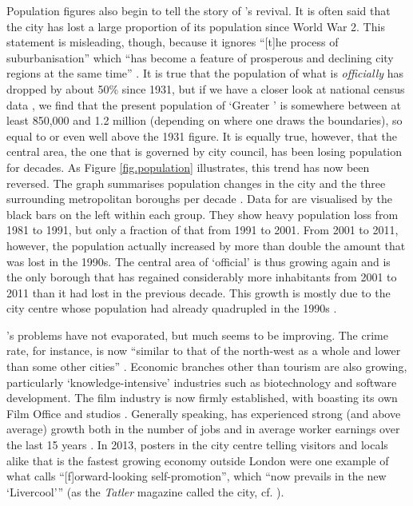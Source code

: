 Population figures also begin to tell the story of 's revival.
It is often said that the city has lost a large proportion of its population since World War 2.
This statement is misleading, though, because it ignores ``[t]he process of suburbanisation'' which ``has become a feature of prosperous and declining city regions at the same time'' \citep[21]{fraser2003}.
It is true that the population of what is \emph{officially}  has dropped by about 50\% since 1931, but if we have a closer look at national census data \parencite{nomis}, we find that the present population of `Greater ' is somewhere between at least 850,000 and 1.2 million (depending on where one draws the boundaries), so equal to or even well above the 1931 figure.
It is equally true, however, that the central area, the one that is governed by  city council, has been losing population for decades.
As Figure \ref{fig.population} illustrates, this trend has now been reversed.
The graph summarises population changes in the city and the three surrounding metropolitan boroughs per decade \parencite{nomis}.
Data for  are visualised by the black bars on the left within each group.
They show heavy population loss from 1981 to 1991, but only a fraction of that from 1991 to 2001.
From 2001 to 2011, however, the population actually increased by more than double the amount that was lost in the 1990s.
The central area of `official'  is thus growing again and is the only borough that has regained considerably more inhabitants from 2001 to 2011 than it had lost in the previous decade.
This growth is mostly due to the city centre whose population had already quadrupled in the 1990s \citep[cf.][xix]{belchem2006c}.

's problems have not evaporated, but much seems to be improving.
The crime rate, for instance, is now ``similar to that of the north-west as a whole and lower than some other cities''  \citep[235]{pooley2006}.
Economic branches other than tourism are also growing, particularly `knowledge-intensive' industries such as biotechnology \citep[cf.][204]{percy2003} and software development.
The film industry is now firmly established, with  boasting its own Film Office and studios \parencite[cf.][478--480]{murden2006}.
Generally speaking,  has experienced strong (and above average) growth both in the number of jobs and in average worker earnings over the last 15 years \parencite[cf.][4]{lcc2016}.
In 2013, posters in the city centre telling visitors and locals alike that  is the fastest growing economy outside London were one example of what \citet[54]{belchem2006a} calls ``[f]orward-looking self-promotion'', which ``now prevails in the new `Livercool'{}'' (as the \emph{Tatler} magazine called the city, cf. \citealt[484]{murden2006}).

